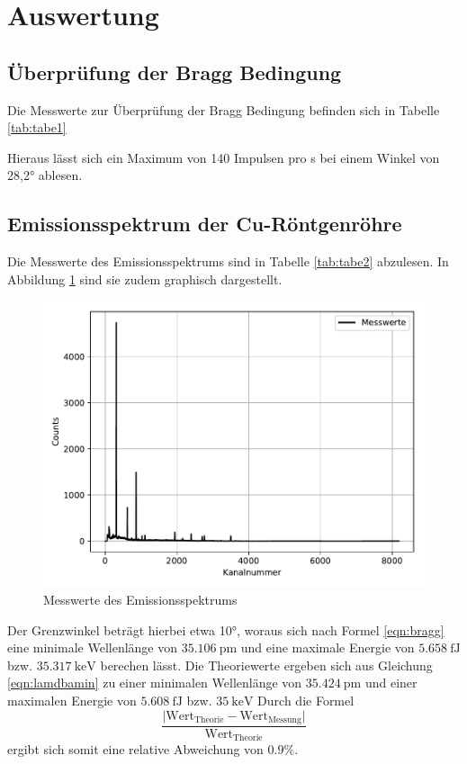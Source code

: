 \section{Auswertung}
\subsection{Überprüfung der Bragg Bedingung}
Die Messwerte zur Überprüfung der Bragg Bedingung befinden sich in Tabelle \ref{tab:tabe1}


Hieraus lässt sich ein Maximum von 140 Impulsen pro s bei einem Winkel von 28,2°
ablesen.

\subsection{Emissionsspektrum der Cu-Röntgenröhre}
Die Messwerte des Emissionsspektrums sind in Tabelle \ref{tab:tabe2} abzulesen. In
Abbildung \ref{fig:plot1} sind sie zudem graphisch dargestellt.


\begin{figure}[H]
  \centering
  \includegraphics{plot1.pdf}
  \caption{Messwerte des Emissionsspektrums}
  \label{fig:plot1}
\end{figure}
Der Grenzwinkel beträgt hierbei etwa 10°, woraus sich nach Formel \ref{eqn:bragg} eine minimale
Wellenlänge von $ \SI{35.106}{\pico\meter}$ und eine maximale Energie von $\SI{5.658}{\femto\joule}$
bzw. $\SI{35.317}{\kilo \electronvolt}$ berechen lässt. Die Theoriewerte ergeben sich
aus Gleichung \ref{eqn:lamdbamin} zu einer minimalen Wellenlänge von $ \SI{35.424}{\pico\meter}$
und einer maximalen Energie von $\SI{5.608}{\femto\joule}$
bzw. $\SI{35}{\kilo \electronvolt}$
Durch die Formel
\begin{equation*}
  \frac{\lvert \text{Wert}_{\text{Theorie}}-\text{Wert}_{\text{Messung}}\rvert}{\text{Wert}_{\text{Theorie}}}
  \label{eqn:abw}
\end{equation*}
ergibt sich somit eine relative Abweichung von $0.9 \%$.

